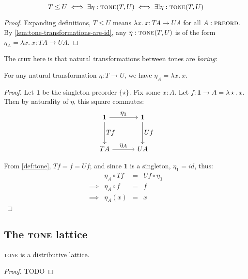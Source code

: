 \documentclass[ribbons]{rntz}
\newcommand{\todo}[1]{{\color{Purple}#1}}
\newcommand{\mb}[1]{\ensuremath{\mathbf{#1}}}
\newcommand{\mi}[1]{\ensuremath{\mathit{#1}}}
\newcommand{\fn}{\lambda}
\newcommand{\binder}{.~}
\newcommand{\bind}[1]{{#1}\binder}
\newcommand{\fnof}[1]{\fn\bind{#1}}
\newcommand{\cat}[1]{\textsc{#1}} %
\newcommand{\Pre}{\cat{preord}}
\newcommand{\Tone}{\cat{tone}}
\newcommand\idfn{\mi{id}}
\begin{document}
\begin{theorem} \label{thm:tone-poset}
  \[T \le U \iff \exists \eta : \Tone(T, U) \iff \exists! \eta : \Tone(T,U)\]
\end{theorem}

\begin{proof}
  Expanding definitions, $T \le U$ means $\fnof{x} x : TA \to
  UA$ for all $A : \Pre$. By \cref{lem:tone-transformations-are-id},
  any $\eta : \Tone(T,U)$ is of the form $\eta_A = \fnof{x} x : TA
  \to UA$.
\end{proof}

The crux here is that natural transformations between tones are \emph{boring}:
\begin{lemma}\label{lem:tone-transformations-are-id}
  For any natural transformation $\eta : T \to U$, we have $\eta_A = \fnof{x}
  x$.
\end{lemma}

\begin{proof}
  Let $\mb{1}$ be the singleton preorder $\{\star\}$. Fix some $x : A$. Let $f :
  \mb{1} \to A = \fnof{\star}{x}$. Then by naturality of $\eta$, this square
  commutes:
  \[\tikzset{
    no line/.style={draw=none,
      commutative diagrams/every label/.append style={/tikz/auto=false}}}
  \begin{tikzcd}[sep=3.3em]
    \mb{1} \arrow[r,"\textstyle \eta_{\mb{1}}"] \arrow[d,"\textstyle Tf"]
    & \mb{1} \arrow[d,"\textstyle Uf"]
    \\ TA \arrow[r,"\textstyle\eta_A"]
    & UA
  \end{tikzcd}\]

From \cref{def:tone}, $Tf = f = Uf$; and since $\mb{1}$ is
a singleton, $\eta_{\mb{1}} = \idfn$, thus:
  \[\begin{array}{rlcl}
  & \eta_A \circ Tf &=& Uf \circ \eta_{\mb{1}}\\
  \implies & \eta_A \circ f &=& f\\
  \implies & \eta_A(x) &=& x
  \end{array}\]
\end{proof}


\subsection{The \Tone{} lattice}

\begin{conjecture}
  \Tone{} is a distributive lattice.
\end{conjecture}
\begin{proof}
  \todo{TODO}
\end{proof}
\end{document}
